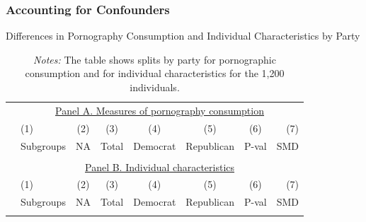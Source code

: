 \documentclass[12pt, letterpaper]{article}
\begin{document}
\subsubsection{Accounting for Confounders}
\begin{table}[ht] \centering \small \setlength\tabcolsep{5 pt}
	\caption{Differences in Pornography Consumption and Individual Characteristics by Party}
	\label{tab:characteristics_split_by_party}
	\begin{adjustbox}{max width=\textwidth}
		\begin{tabular}{@{\hspace{0\tabcolsep}}llrcccrr@{\hspace{0\tabcolsep}}}
			\toprule
			&\multicolumn{7}{c}{\underline{Panel A. Measures of pornography consumption}}\\
			&\multicolumn{1}{l}{(1)}&\multicolumn{1}{c}{(2)}&\multicolumn{1}{c}{(3)}&\multicolumn{1}{c}{(4)}&\multicolumn{1}{c}{(5)}&\multicolumn{1}{c}{(6)}&\multicolumn{1}{r}{(7)}\\			
			&\multicolumn{1}{l}{Subgroups}&\multicolumn{1}{c}{NA}&\multicolumn{1}{c}{Total}&\multicolumn{1}{c}{Democrat}&\multicolumn{1}{c}{Republican}&\multicolumn{1}{c}{P-val}&\multicolumn{1}{r}{SMD}\\
			\cmidrule{2-8}
			\\
			\cmidrule{2-8}
			&\multicolumn{7}{c}{\underline{Panel B. Individual characteristics}}\\
			&\multicolumn{1}{l}{(1)}&\multicolumn{1}{c}{(2)}&\multicolumn{1}{c}{(3)}&\multicolumn{1}{c}{(4)}&\multicolumn{1}{c}{(5)}&\multicolumn{1}{c}{(6)}&\multicolumn{1}{r}{(7)}\\			
			&\multicolumn{1}{l}{Subgroups}&\multicolumn{1}{c}{NA}&\multicolumn{1}{c}{Total}&\multicolumn{1}{c}{Democrat}&\multicolumn{1}{c}{Republican}&\multicolumn{1}{c}{P-val}&\multicolumn{1}{r}{SMD}\\
			\cmidrule{2-8}
			\\
			\bottomrule
		\end{tabular}
	\end{adjustbox}
	\caption*{\scriptsize \emph{Notes:}
		The table shows splits by party for pornographic consumption and for individual characteristics for the 1,200 individuals.
}
\end{table}
\end{document}
